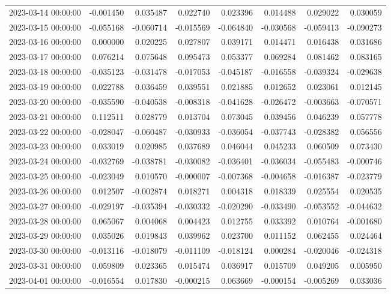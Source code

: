 \begin{tabular}{lrrrrrrr}
2023-03-14 00:00:00 & -0.001450 & 0.035487 & 0.022740 & 0.023396 & 0.014488 & 0.029022 & 0.030059 \\
2023-03-15 00:00:00 & -0.055168 & -0.060714 & -0.015569 & -0.064840 & -0.030568 & -0.059413 & -0.090273 \\
2023-03-16 00:00:00 & 0.000000 & 0.020225 & 0.027807 & 0.039171 & 0.014471 & 0.016438 & 0.031686 \\
2023-03-17 00:00:00 & 0.076214 & 0.075648 & 0.095473 & 0.053377 & 0.069284 & 0.081462 & 0.083165 \\
2023-03-18 00:00:00 & -0.035123 & -0.031478 & -0.017053 & -0.045187 & -0.016558 & -0.039324 & -0.029638 \\
2023-03-19 00:00:00 & 0.022788 & 0.036459 & 0.039551 & 0.021885 & 0.012652 & 0.023061 & 0.012145 \\
2023-03-20 00:00:00 & -0.035590 & -0.040538 & -0.008318 & -0.041628 & -0.026472 & -0.003663 & -0.070571 \\
2023-03-21 00:00:00 & 0.112511 & 0.028779 & 0.013704 & 0.073045 & 0.039456 & 0.046239 & 0.057778 \\
2023-03-22 00:00:00 & -0.028047 & -0.060487 & -0.030933 & -0.036054 & -0.037743 & -0.028382 & 0.056556 \\
2023-03-23 00:00:00 & 0.033019 & 0.020985 & 0.037689 & 0.046044 & 0.045233 & 0.060509 & 0.073430 \\
2023-03-24 00:00:00 & -0.032769 & -0.038781 & -0.030082 & -0.036401 & -0.036034 & -0.055483 & -0.000746 \\
2023-03-25 00:00:00 & -0.023049 & 0.010570 & -0.000007 & -0.007368 & -0.004658 & -0.016387 & -0.023779 \\
2023-03-26 00:00:00 & 0.012507 & -0.002874 & 0.018271 & 0.004318 & 0.018339 & 0.025554 & 0.020535 \\
2023-03-27 00:00:00 & -0.029197 & -0.035394 & -0.030332 & -0.020290 & -0.033490 & -0.053552 & -0.044632 \\
2023-03-28 00:00:00 & 0.065067 & 0.004068 & 0.004423 & 0.012755 & 0.033392 & 0.010764 & -0.001680 \\
2023-03-29 00:00:00 & 0.035026 & 0.019843 & 0.039962 & 0.023700 & 0.011152 & 0.062455 & 0.024464 \\
2023-03-30 00:00:00 & -0.013116 & -0.018079 & -0.011109 & -0.018124 & 0.000284 & -0.020046 & -0.024318 \\
2023-03-31 00:00:00 & 0.059809 & 0.023365 & 0.015474 & 0.036917 & 0.015709 & 0.049205 & 0.005950 \\
2023-04-01 00:00:00 & -0.016554 & 0.017830 & -0.000215 & 0.063669 & -0.000154 & -0.005269 & 0.033036 \\

\end{tabular}
